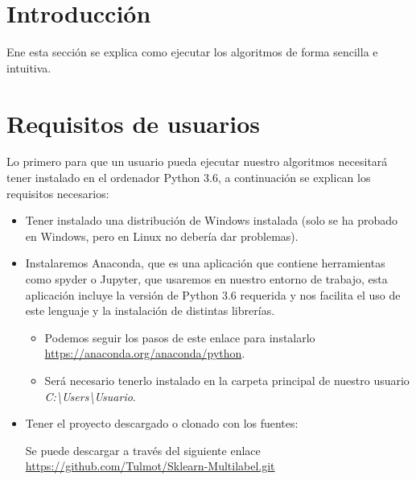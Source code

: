 
\section{Introducción}
Ene esta sección se explica como ejecutar los algoritmos de forma sencilla e intuitiva.

\section{Requisitos de usuarios}
Lo primero para que un usuario pueda ejecutar nuestro algoritmos necesitará tener instalado en el ordenador Python 3.6, a continuación se explican los requisitos necesarios:
\begin{itemize}
	\item Tener instalado una distribución de Windows instalada (solo se ha probado en Windows, pero en Linux no debería dar problemas).
	\item Instalaremos Anaconda, que es una aplicación que contiene herramientas como spyder o Jupyter, que usaremos en nuestro entorno de trabajo, esta aplicación incluye la versión de Python 3.6 requerida y nos facilita el uso de este lenguaje y la instalación de distintas librerías.
	\begin{itemize}
		\item Podemos seguir los pasos de este enlace para instalarlo \url{https://anaconda.org/anaconda/python}.		
    	\item Será necesario tenerlo instalado en la carpeta principal de nuestro usuario \textit{C:\textbackslash Users\textbackslash Usuario}.
	\end{itemize}
\item Tener el proyecto descargado o clonado con los fuentes: 

Se puede descargar a través del siguiente enlace \url{https://github.com/Tulmot/Sklearn-Multilabel.git}
\end{itemize}

